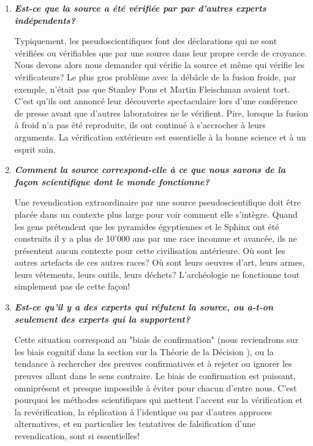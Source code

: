 \begin{enumerate}[label=\protect\circledbullet{\arabic*},leftmargin=15mm]
		\item \textit{\textbf{Est-ce que la source a \'et\'e v\'erifi\'ee par par d'autres experts ind\'ependents?}}
		
		Typiquement, les pseudoscientifiques font des d\'eclarations qui ne sont v\'erifi\'ees ou v\'erifiables que par une source dans leur propre cercle de croyance. Nous devons alors nous demander qui v\'erifie la source et même qui v\'erifie les v\'erificateurs? Le plus gros problème avec la d\'ebâcle de la fusion froide, par exemple, n'\'etait pas que Stanley Pons et Martin Fleischman avaient tort. C'est qu'ils ont annonc\'e leur d\'ecouverte spectaculaire lors d'une conf\'erence de presse avant que d'autres laboratoires ne le v\'erifient. Pire, lorsque la fusion à froid n'a pas \'et\'e reproduite, ils ont continu\'e à s'accrocher à leurs arguments. La v\'erification ext\'erieure est essentielle à la bonne science et à un esprit sain.

		\item \textit{\textbf{Comment la source correspond-elle à ce que nous savons de la façon scientifique dont le monde fonctionne?}}

		Une revendication extraordinaire par une source pseudoscientifique doit être plac\'ee dans un contexte plus large pour voir comment elle s'intègre. Quand les gens pr\'etendent que les pyramides \'egyptiennes et le Sphinx ont \'et\'e construits il y a plus de 10'000 ans par une race inconnue et avanc\'ee, ils ne pr\'esentent aucun contexte pour cette civilisation ant\'erieure. Où sont les autres artefacts de ces autres races? Où sont leurs oeuvres d'art, leurs armes, leurs vêtements, leurs outils, leurs d\'echets? L'arch\'eologie ne fonctionne tout simplement pas de cette façon!

		\item \textit{\textbf{Est-ce qu'il y a des experts qui r\'efutent la source, ou a-t-on seulement des experts qui la supportent?}}

		Cette situation correspond au "biais de confirmation" (nous reviendrons sur les biais cognitif dans la section sur la Th\'eorie de la D\'ecision \pageref{cognitive bias}), ou la tendance à rechercher des preuves confirmatives et à rejeter ou ignorer les preuves allant dans le sens contraire. Le biais de confirmation est puissant, omnipr\'esent et presque impossible à \'eviter pour chacun d'entre nous. C'est pourquoi les m\'ethodes scientifiques qui mettent l'accent sur la v\'erification et la rev\'erification, la r\'eplication à l'identique ou par d'autres approces alternatives, et en particulier les tentatives de falsification d'une revendication, sont si essentielles!


\end{enumerate}
